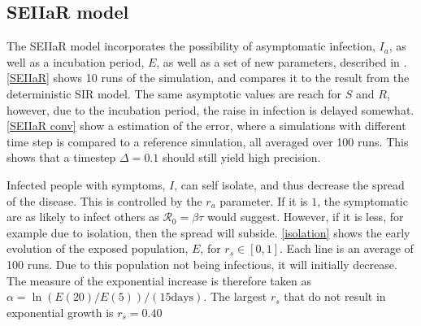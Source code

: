 \documentclass{article}
\begin{document}
    \subsection*{SEIIaR model}
    The SEIIaR model incorporates the possibility of asymptomatic infection, $I_a$, as well as a incubation period, $E$, as well as a set of new parameters, described in \cite{exam}.
    \autoref{SEIIaR} shows 10 runs of the simulation, and compares it to the result from the deterministic SIR model.
    The same asymptotic values are reach for $S$ and $R$, however, due to the incubation period, the raise in infection is delayed somewhat.
    \autoref{SEIIaR conv} show a estimation of the error, where a simulations with different time step is compared to a reference simulation, all averaged over 100 runs.
    This shows that a timestep $\Delta = 0.1$ should still yield high precision.

    Infected people with symptoms, $I$, can self isolate, and thus decrease the spread of the disease.
    This is controlled by the $r_a$ parameter.
    If it is $1$, the symptomatic are as likely to infect others as $\mathcal{R}_0 = \beta \tau $ would suggest. 
    However, if it is less, for example due to isolation, then the spread will subside.
    \autoref{isolation} shows the early evolution of the exposed population, $E$, for $r_s\in [0, 1]$.
    Each line is an average of 100 runs.
    Due to this population not being infectious, it will initially decrease.
    The measure of the exponential increase is therefore taken as $\alpha = \ln\left(E(20)/E(5)\right)/(15 \mathrm{days})$.
    The largest $r_s$ that do not result in exponential growth is $r_s = 0.40$
    
\end{document}
